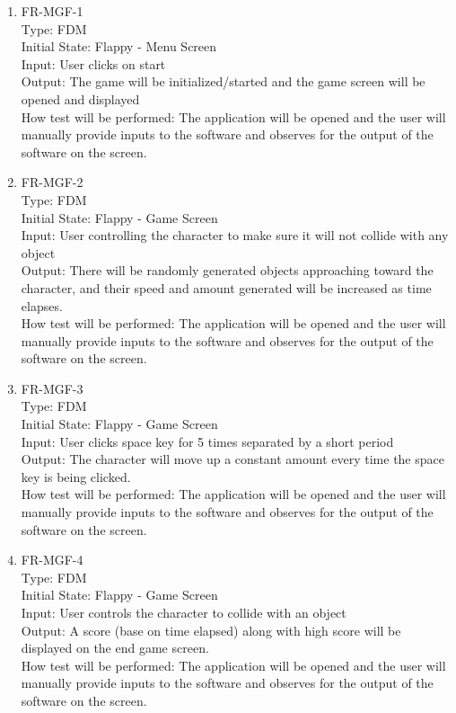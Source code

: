 \documentclass[12pt, titlepage]{article}
\begin{document}
\begin{enumerate}

\item{FR-MGF-1\\}
Type: FDM\\
Initial State: Flappy - Menu Screen\\
Input: User clicks on start\\
Output: The game will be initialized/started and the game screen will be opened and displayed\\
How test will be performed: The application will be opened and the user will manually provide inputs to the software and observes for the output of the software on the screen.\\

\item{FR-MGF-2\\}
Type: FDM\\
Initial State: Flappy - Game Screen\\
Input: User controlling the character to make sure it will not collide with any object\\
Output: There will be randomly generated objects approaching toward the character, and their speed and amount generated will be increased as time elapses.\\
How test will be performed: The application will be opened and the user will manually provide inputs to the software and observes for the output of the software on the screen.\\

\item{FR-MGF-3\\}
Type: FDM\\
Initial State: Flappy - Game Screen\\
Input: User clicks space key for 5 times separated by a short period\\
Output: The character will move up a constant amount every time the space key is being clicked.\\
How test will be performed: The application will be opened and the user will manually provide inputs to the software and observes for the output of the software on the screen.\\

\item{FR-MGF-4\\}
Type: FDM\\
Initial State: Flappy - Game Screen\\
Input: User controls the character to collide with an object\\
Output: A score (base on time elapsed) along with high score will be displayed on the end game screen.\\
How test will be performed: The application will be opened and the user will manually provide inputs to the software and observes for the output of the software on the screen.\\


\end{enumerate}
\end{document}

